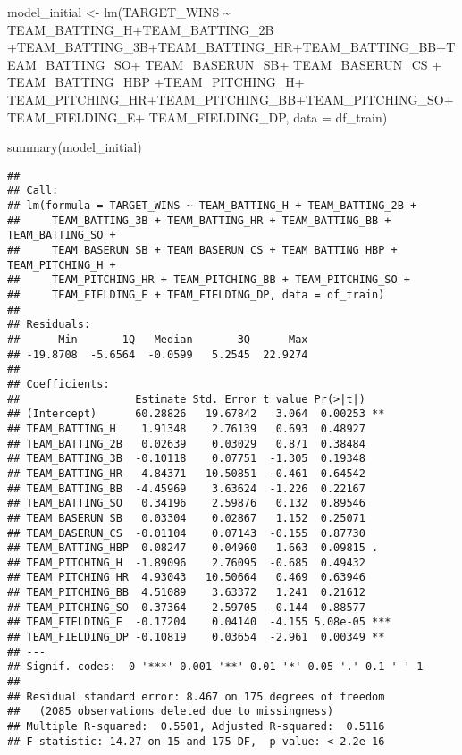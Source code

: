 \documentclass[
]{article}
\newenvironment{Shaded}{\begin{snugshade}}{\end{snugshade}}
\newcommand{\AttributeTok}[1]{\textcolor[rgb]{0.77,0.63,0.00}{#1}}
\newcommand{\FunctionTok}[1]{\textcolor[rgb]{0.00,0.00,0.00}{#1}}
\newcommand{\NormalTok}[1]{#1}
\newcommand{\OtherTok}[1]{\textcolor[rgb]{0.56,0.35,0.01}{#1}}
\newcommand{\SpecialCharTok}[1]{\textcolor[rgb]{0.00,0.00,0.00}{#1}}
\begin{document}
\begin{Shaded}
\begin{Highlighting}[]
\NormalTok{model\_initial }\OtherTok{\textless{}{-}} \FunctionTok{lm}\NormalTok{(TARGET\_WINS }\SpecialCharTok{\textasciitilde{}}\NormalTok{ TEAM\_BATTING\_H}\SpecialCharTok{+}\NormalTok{TEAM\_BATTING\_2B }\SpecialCharTok{+}\NormalTok{TEAM\_BATTING\_3B}\SpecialCharTok{+}\NormalTok{TEAM\_BATTING\_HR}\SpecialCharTok{+}\NormalTok{TEAM\_BATTING\_BB}\SpecialCharTok{+}\NormalTok{TEAM\_BATTING\_SO}\SpecialCharTok{+}
\NormalTok{TEAM\_BASERUN\_SB}\SpecialCharTok{+}\NormalTok{ TEAM\_BASERUN\_CS }\SpecialCharTok{+}\NormalTok{ TEAM\_BATTING\_HBP }\SpecialCharTok{+}\NormalTok{TEAM\_PITCHING\_H}\SpecialCharTok{+}\NormalTok{ TEAM\_PITCHING\_HR}\SpecialCharTok{+}\NormalTok{TEAM\_PITCHING\_BB}\SpecialCharTok{+}\NormalTok{TEAM\_PITCHING\_SO}\SpecialCharTok{+}\NormalTok{TEAM\_FIELDING\_E}\SpecialCharTok{+}\NormalTok{ TEAM\_FIELDING\_DP, }\AttributeTok{data =}\NormalTok{ df\_train)}

\FunctionTok{summary}\NormalTok{(model\_initial)}
\end{Highlighting}
\end{Shaded}

\begin{verbatim}
## 
## Call:
## lm(formula = TARGET_WINS ~ TEAM_BATTING_H + TEAM_BATTING_2B + 
##     TEAM_BATTING_3B + TEAM_BATTING_HR + TEAM_BATTING_BB + TEAM_BATTING_SO + 
##     TEAM_BASERUN_SB + TEAM_BASERUN_CS + TEAM_BATTING_HBP + TEAM_PITCHING_H + 
##     TEAM_PITCHING_HR + TEAM_PITCHING_BB + TEAM_PITCHING_SO + 
##     TEAM_FIELDING_E + TEAM_FIELDING_DP, data = df_train)
## 
## Residuals:
##      Min       1Q   Median       3Q      Max 
## -19.8708  -5.6564  -0.0599   5.2545  22.9274 
## 
## Coefficients:
##                  Estimate Std. Error t value Pr(>|t|)    
## (Intercept)      60.28826   19.67842   3.064  0.00253 ** 
## TEAM_BATTING_H    1.91348    2.76139   0.693  0.48927    
## TEAM_BATTING_2B   0.02639    0.03029   0.871  0.38484    
## TEAM_BATTING_3B  -0.10118    0.07751  -1.305  0.19348    
## TEAM_BATTING_HR  -4.84371   10.50851  -0.461  0.64542    
## TEAM_BATTING_BB  -4.45969    3.63624  -1.226  0.22167    
## TEAM_BATTING_SO   0.34196    2.59876   0.132  0.89546    
## TEAM_BASERUN_SB   0.03304    0.02867   1.152  0.25071    
## TEAM_BASERUN_CS  -0.01104    0.07143  -0.155  0.87730    
## TEAM_BATTING_HBP  0.08247    0.04960   1.663  0.09815 .  
## TEAM_PITCHING_H  -1.89096    2.76095  -0.685  0.49432    
## TEAM_PITCHING_HR  4.93043   10.50664   0.469  0.63946    
## TEAM_PITCHING_BB  4.51089    3.63372   1.241  0.21612    
## TEAM_PITCHING_SO -0.37364    2.59705  -0.144  0.88577    
## TEAM_FIELDING_E  -0.17204    0.04140  -4.155 5.08e-05 ***
## TEAM_FIELDING_DP -0.10819    0.03654  -2.961  0.00349 ** 
## ---
## Signif. codes:  0 '***' 0.001 '**' 0.01 '*' 0.05 '.' 0.1 ' ' 1
## 
## Residual standard error: 8.467 on 175 degrees of freedom
##   (2085 observations deleted due to missingness)
## Multiple R-squared:  0.5501, Adjusted R-squared:  0.5116 
## F-statistic: 14.27 on 15 and 175 DF,  p-value: < 2.2e-16
\end{verbatim}
\end{document}
